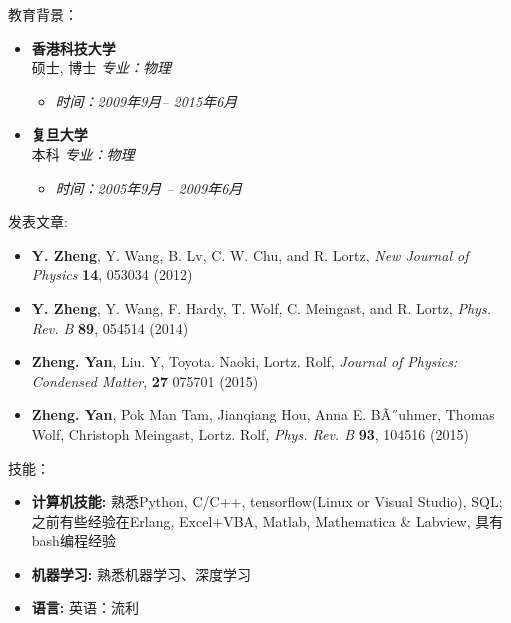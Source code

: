 \documentclass[a4paper,9pt,oneside]{scrartcl}
\newenvironment{ressection}[1]{
    \vspace{2pt}
    {\large#1}
    \begin{itemize}
    \vspace{2pt}
}{
    \end{itemize}
}
\newcommand{\resitem}[1]{
    \vspace{-4pt}
    \item #1
}
\newcommand{\resitems}[1]{
    \vspace{-4pt}
    \item #1
}
\newcommand{\ressubitem}[1]{
    \vspace{0pt}
    \item #1
}
\newcommand{\resbigitem}[3]{
    \vspace{-5pt}
    \item
    \textbf{#1}\\
    #2
    \textit{#3}
}
\newenvironment{ressubsec}[3]{
\resbigitem{#1}{#2}{#3}
    \vspace{-2pt}
    \begin{itemize}
}{
    \end{itemize}
}
\begin{document}
\begin{CJK*}{UTF8}{gbsn}


\begin{ressection}{教育背景：}
    \begin{ressubsec}{香港科技大学}{硕士, 博士} {专业：物理} 
        \ressubitem{\itshape 时间：2009年9月-- 2015年6月}
    \end{ressubsec}
    \begin{ressubsec}{复旦大学}{本科}{专业：物理}
        \ressubitem{\itshape 时间：2005年9月 -- 2009年6月}
    \end{ressubsec}
\end{ressection}


\begin{ressection}{发表文章:}
	\resitems{\textbf{Y. Zheng}, Y. Wang, B. Lv, C. W. Chu, and R. Lortz, \emph{New Journal of Physics} \textbf{14}, 053034 (2012)}
	\resitems{\textbf{Y. Zheng}, Y. Wang, F. Hardy, T. Wolf, C. Meingast, and R. Lortz, \emph{Phys. Rev. B} \textbf{89}, 054514 (2014)}
	\resitems{\textbf{Zheng. Yan}, Liu. Y, Toyota. Naoki, Lortz. Rolf, \emph{Journal of Physics: Condensed Matter}, \textbf{27} 075701 (2015)}
	\resitems{\textbf{Zheng. Yan}, Pok Man Tam, Jianqiang Hou, Anna E. BÃ˝uhmer, Thomas Wolf, Christoph Meingast, Lortz. Rolf, \emph{Phys. Rev. B} \textbf{93}, 104516
	(2015)}
\end{ressection}



\begin{ressection}{技能：}
    \resitem{\textbf{计算机技能:}  熟悉Python, C/C++, tensorflow(Linux or Visual Studio), SQL; 之前有些经验在Erlang, Excel+VBA, Matlab, Mathematica \& Labview, 具有bash编程经验}
	\resitem{\textbf{机器学习:} 熟悉机器学习、深度学习}
    \resitem{\textbf{语言:} 英语：流利}

\end{ressection}

\vspace{2pt}

\end{CJK*}
\end{document}
